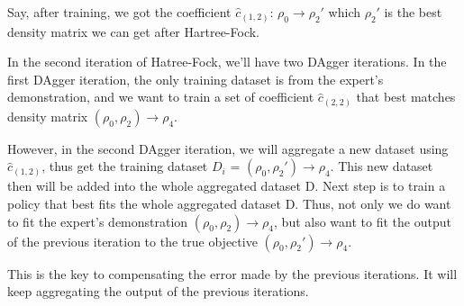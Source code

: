 \documentclass[twoside,11pt]{article}
\begin{document}
Say, after training, we got the coefficient $\hat{c}_{(1,2)}$: $\rho_0 \rightarrow \rho_{2}'$ which $\rho_2'$ is the best density matrix we can get after Hartree-Fock.


In the second iteration of Hatree-Fock, we'll have two DAgger iterations. In the first DAgger iteration, the only training dataset is from the expert's demonstration, and we want to train a set of coefficient  $\hat{c}_{(2,2)}$ that best matches density matrix $(\rho_0,\rho_2) \rightarrow \rho_4$.

However, in the second DAgger iteration, we will aggregate a new dataset using $\hat{c}_{(1,2)}$, thus get the training dataset $D_i$ = $(\rho_0, \rho_2') \rightarrow \rho_4$. This new dataset then will be added into the whole aggregated dataset D.
Next step is to train a policy that best fits the whole aggregated dataset D. Thus, not only we do want to fit the expert's demonstration $(\rho_0, \rho_2) \rightarrow \rho_4$, but also want to fit the output of the previous iteration to the true objective $ (\rho_0,\rho_{2}') \rightarrow \rho_4$. 


This is the key to compensating the error made by the previous iterations. It will keep aggregating the output of the previous iterations.





\end{document}
